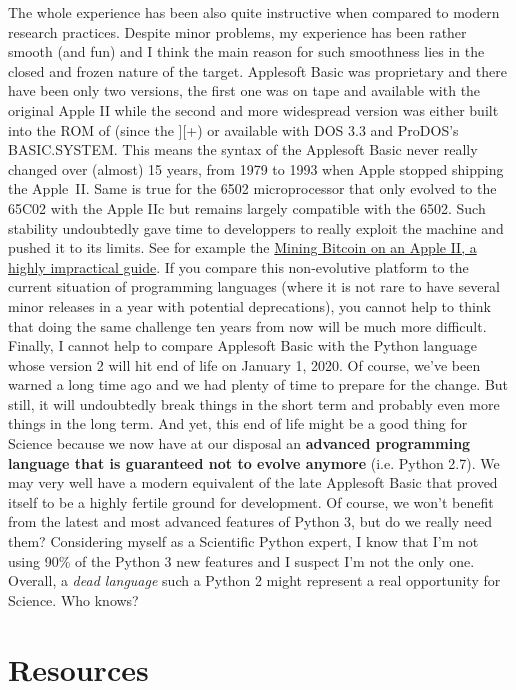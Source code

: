 The whole experience has been also quite instructive when compared to modern
research practices. Despite minor problems, my experience has been rather
smooth (and fun) and I think the main reason for such smoothness lies in the
closed and frozen nature of the target. Applesoft Basic was proprietary and
there have been only two versions, the first one was on tape and available with
the original Apple II while the second and more widespread version was either
built into the ROM of (since the ][+) or available with DOS 3.3 and ProDOS's
BASIC.SYSTEM. This means the syntax of the Applesoft Basic never really changed
over (almost) 15 years, from 1979 to 1993 when Apple stopped shipping the
Apple~II. Same is true for the 6502 microprocessor that only evolved to the
65C02 with the Apple IIc but remains largely compatible with the 6502. Such
stability undoubtedly gave time to developpers to really exploit the machine
and pushed it to its limits. See for example
the \href{https://retroconnector.com/mining-bitcoin-on-an-apple-ii-a-highly-impractical-guide/}{
Mining Bitcoin on an Apple II, a highly impractical guide}. If you compare this
non-evolutive platform to the current situation of programming languages (where
it is not rare to have several minor releases in a year with potential
deprecations), you cannot help to think that doing the same challenge ten years
from now will be much more difficult.\\

Finally, I cannot help to compare Applesoft Basic with the Python language
whose version 2 will hit end of life on January 1, 2020. Of course, we've been
warned a long time ago and we had plenty of time to prepare for the change. But
still, it will undoubtedly break things in the short term and probably even more
things in the long term. And yet, this end of life might be a good thing for
Science because we now have at our disposal an \textbf{advanced programming
language that is guaranteed not to evolve anymore} (i.e. Python 2.7). We may
very well have a modern equivalent of the late Applesoft Basic that proved
itself to be a highly fertile ground for development. Of course, we won't
benefit from the latest and most advanced features of Python 3, but do we
really need them?  Considering myself as a Scientific Python expert, I know
that I'm not using 90\% of the Python 3 new features and I suspect I'm not the
only one. Overall, a {\em dead language} such a Python 2 might represent a real
opportunity for Science. Who knows?


\section*{Resources}

